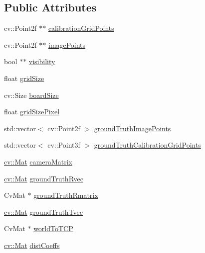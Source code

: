 \subsection*{Public Attributes}
\begin{DoxyCompactItemize}
\item 
cv\-::\-Point2f $\ast$$\ast$ \hyperlink{classsvl_c_c_calibration_grid_a16c87e7174d1ebadad02bb2f00374f20}{calibration\-Grid\-Points}
\item 
cv\-::\-Point2f $\ast$$\ast$ \hyperlink{classsvl_c_c_calibration_grid_af7379a6c73a59f86c73d299137455ac5}{image\-Points}
\item 
bool $\ast$$\ast$ \hyperlink{classsvl_c_c_calibration_grid_a7022b0856e07b5004a767fdd80d78e4a}{visibility}
\item 
float \hyperlink{classsvl_c_c_calibration_grid_ab80850211d593053f9742680204ad68d}{grid\-Size}
\item 
cv\-::\-Size \hyperlink{classsvl_c_c_calibration_grid_a0c584283648c8d63a0c33646d35a60f2}{board\-Size}
\item 
float \hyperlink{classsvl_c_c_calibration_grid_a6bc5a200e85665be8811614a3abe470b}{grid\-Size\-Pixel}
\item 
std\-::vector$<$ cv\-::\-Point2f $>$ \hyperlink{classsvl_c_c_calibration_grid_a1956cef695c8327984c5ba89b20b562b}{ground\-Truth\-Image\-Points}
\item 
std\-::vector$<$ cv\-::\-Point3f $>$ \hyperlink{classsvl_c_c_calibration_grid_a999d324f40227be7e33c7549f217bced}{ground\-Truth\-Calibration\-Grid\-Points}
\item 
\hyperlink{namespacecv_a60d81b54f4914bec4cc4a72ab77eb444}{cv\-::\-Mat} \hyperlink{classsvl_c_c_calibration_grid_a7a2116179fd17b6225c5fbeab19d99a0}{camera\-Matrix}
\item 
\hyperlink{namespacecv_a60d81b54f4914bec4cc4a72ab77eb444}{cv\-::\-Mat} \hyperlink{classsvl_c_c_calibration_grid_aa4eae79ebad278af9e217a647af596d9}{ground\-Truth\-Rvec}
\item 
Cv\-Mat $\ast$ \hyperlink{classsvl_c_c_calibration_grid_afce9a2410faf4d8bcd8a44fa7e6aab22}{ground\-Truth\-Rmatrix}
\item 
\hyperlink{namespacecv_a60d81b54f4914bec4cc4a72ab77eb444}{cv\-::\-Mat} \hyperlink{classsvl_c_c_calibration_grid_a76d4c8a5a30be5afc085db95aeae4505}{ground\-Truth\-Tvec}
\item 
Cv\-Mat $\ast$ \hyperlink{classsvl_c_c_calibration_grid_a76795dc4a6916d8c4cc6c2eec54bf049}{world\-To\-T\-C\-P}
\item 
\hyperlink{namespacecv_a60d81b54f4914bec4cc4a72ab77eb444}{cv\-::\-Mat} \hyperlink{classsvl_c_c_calibration_grid_a24635710953d9ad967caed593db745cf}{dist\-Coeffs}
$$
\end{DoxyCompactItemize}
